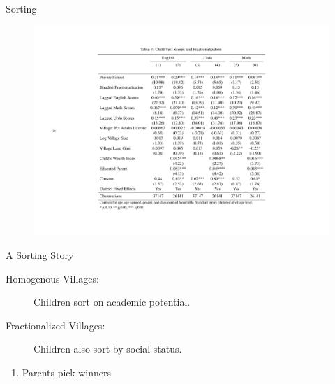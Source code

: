\documentclass{beamer}
\begin{document}
\begin{frame}{Sorting}
	\begin{figure}[htb]
		\begin{center}
		\includegraphics[scale=0.65]{tables/mean_preserving.pdf}
		\end{center}
	\end{figure}
	
\end{frame}

\begin{frame}{A Sorting Story}
	\begin{description}
		\item [Homogenous Villages:] Children sort on academic potential.
		\item [Fractionalized Villages:] Children also sort by social status.
	\end{description}
	\pause
	\begin{enumerate}
		\item Parents pick winners
	\end{enumerate}
\end{frame}
\end{document}
